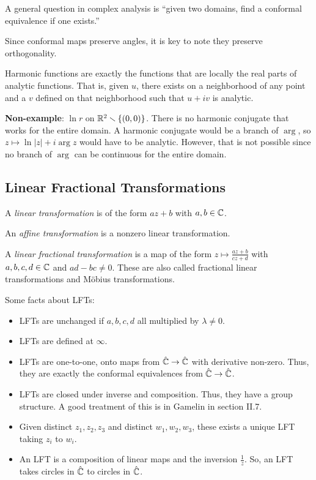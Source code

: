 \documentclass[11pt,leqno,oneside]{amsart}
\numberwithin{thm}{section}
\begin{document}
A general question in complex analysis is ``given two domains, find a conformal
equivalence if one exists.''

Since conformal maps preserve angles, it is key to note they preserve
orthogonality.

\begin{rmk}
  Harmonic functions are exactly the functions that are locally the real parts
  of analytic functions. That is, given $u$, there exists on a neighborhood of
  any point and a $v$ defined on that neighborhood such that $u+iv$ is
  analytic.
\end{rmk}

\begin{example}
  \textbf{Non-example}: $\ln r$ on ${\mathbb R}^2 \smallsetminus \{(0,0)\}$. There is no
  harmonic conjugate that works for the entire domain. A harmonic conjugate
  would be a branch of $\arg$, so $z \mapsto \ln|z|+i\arg z$ would have to be
  analytic. However, that is not possible since no branch of $\arg$ can be
  continuous for the entire domain.
\end{example}

\subsection{Linear Fractional Transformations}
\begin{defn}
    A \emph{linear transformation} is of the form $az + b$ with $a,b \in {\mathbb C}$.
\end{defn}
\begin{defn}
    An \emph{affine transformation} is a nonzero linear transformation.
\end{defn}
\begin{defn}
    A \emph{linear fractional transformation} is a map of the form $z \mapsto
    \frac{az+b}{cz+d}$ with $a,b,c,d \in {\mathbb C}$ and $ad-bc \neq 0$. These are also
    called fractional linear transformations and M{\"o}bius transformations.
  \end{defn}

  Some facts about LFTs:
  \begin{itemize}
  \item LFTs are unchanged if $a,b,c,d$ all multiplied by $\lambda \neq 0$.
  \item LFTs are defined at $\infty$.
  \item LFTs are one-to-one, onto maps from $\hat{{\mathbb C}} \to \hat{{\mathbb C}}$ with
    derivative non-zero. Thus, they are exactly the conformal equivalences from
    $\hat{{\mathbb C}} \to \hat{{\mathbb C}}$.
  \item LFTs are closed under inverse and composition. Thus, they have a group
    structure. A good treatment of this is in Gamelin in section II.7.
  \item Given distinct $z_1,z_2,z_3$ and distinct $w_1,w_2,w_3$, these exists a
    unique LFT taking $z_i$ to $w_i$.
    \item An LFT is a composition of linear maps and the inversion
      $\frac{1}{z}$. So, an LFT takes circles in $\hat{{\mathbb C}}$ to circles in
      $\hat{{\mathbb C}}$.
  \end{itemize}
\end{document}
